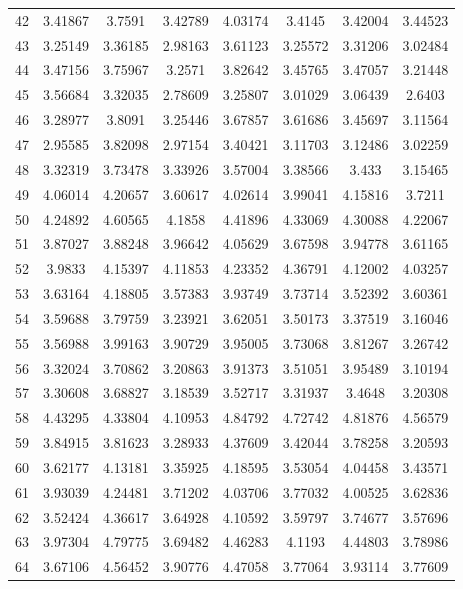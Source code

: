 \begin{center}
\begin{longtable}{cccccccc}
42 & 3.41867 & 3.7591 & 3.42789 & 4.03174 & 3.4145 & 3.42004 & 3.44523\\
43 & 3.25149 & 3.36185 & 2.98163 & 3.61123 & 3.25572 & 3.31206 & 3.02484\\
44 & 3.47156 & 3.75967 & 3.2571 & 3.82642 & 3.45765 & 3.47057 & 3.21448\\
45 & 3.56684 & 3.32035 & 2.78609 & 3.25807 & 3.01029 & 3.06439 & 2.6403\\
46 & 3.28977 & 3.8091 & 3.25446 & 3.67857 & 3.61686 & 3.45697 & 3.11564\\
47 & 2.95585 & 3.82098 & 2.97154 & 3.40421 & 3.11703 & 3.12486 & 3.02259\\
48 & 3.32319 & 3.73478 & 3.33926 & 3.57004 & 3.38566 & 3.433 & 3.15465\\
49 & 4.06014 & 4.20657 & 3.60617 & 4.02614 & 3.99041 & 4.15816 & 3.7211\\
50 & 4.24892 & 4.60565 & 4.1858 & 4.41896 & 4.33069 & 4.30088 & 4.22067\\
51 & 3.87027 & 3.88248 & 3.96642 & 4.05629 & 3.67598 & 3.94778 & 3.61165\\
52 & 3.9833 & 4.15397 & 4.11853 & 4.23352 & 4.36791 & 4.12002 & 4.03257\\
53 & 3.63164 & 4.18805 & 3.57383 & 3.93749 & 3.73714 & 3.52392 & 3.60361\\
54 & 3.59688 & 3.79759 & 3.23921 & 3.62051 & 3.50173 & 3.37519 & 3.16046\\
55 & 3.56988 & 3.99163 & 3.90729 & 3.95005 & 3.73068 & 3.81267 & 3.26742\\
56 & 3.32024 & 3.70862 & 3.20863 & 3.91373 & 3.51051 & 3.95489 & 3.10194\\
57 & 3.30608 & 3.68827 & 3.18539 & 3.52717 & 3.31937 & 3.4648 & 3.20308\\
58 & 4.43295 & 4.33804 & 4.10953 & 4.84792 & 4.72742 & 4.81876 & 4.56579\\
59 & 3.84915 & 3.81623 & 3.28933 & 4.37609 & 3.42044 & 3.78258 & 3.20593\\
60 & 3.62177 & 4.13181 & 3.35925 & 4.18595 & 3.53054 & 4.04458 & 3.43571\\
61 & 3.93039 & 4.24481 & 3.71202 & 4.03706 & 3.77032 & 4.00525 & 3.62836\\
62 & 3.52424 & 4.36617 & 3.64928 & 4.10592 & 3.59797 & 3.74677 & 3.57696\\
63 & 3.97304 & 4.79775 & 3.69482 & 4.46283 & 4.1193 & 4.44803 & 3.78986\\
64 & 3.67106 & 4.56452 & 3.90776 & 4.47058 & 3.77064 & 3.93114 & 3.77609\\

\end{longtable}
\end{center}
